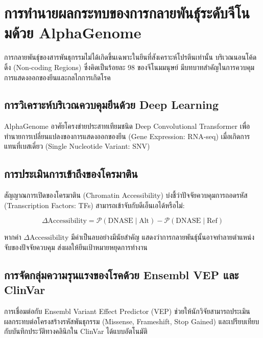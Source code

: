\chapter{การทำนายผลกระทบของการกลายพันธุ์ระดับจีโนมด้วย AlphaGenome}

การกลายพันธุ์ของสารพันธุกรรมไม่ได้เกิดขึ้นเฉพาะในยีนที่สังเคราะห์โปรตีนเท่านั้น บริเวณนอนโค้ดดิ้ง (Non-coding Regions) ซึ่งคิดเป็นร้อยละ 98 ของจีโนมมนุษย์ มีบทบาทสำคัญในการควบคุมการแสดงออกของยีนและกลไกการเกิดโรค

\section{การวิเคราะห์บริเวณควบคุมยีนด้วย Deep Learning}

AlphaGenome อาศัยโครงข่ายประสาทเทียมชนิด Deep Convolutional Transformer เพื่อทำนายการเปลี่ยนแปลงของการแสดงออกของยีน (Gene Expression: RNA-seq) เมื่อเกิดการแทนที่เบสเดี่ยว (Single Nucleotide Variant: SNV)

\section{การประเมินการเข้าถึงของโครมาติน}

สัญญาณการเปิดของโครมาติน (Chromatin Accessibility) บ่งชี้ว่าปัจจัยควบคุมการถอดรหัส (Transcription Factors: TFs) สามารถเข้าจับกับดีเอ็นเอได้หรือไม่:

\begin{equation}
\Delta \text{Accessibility} = \mathcal{P}(\text{DNASE} \mid \text{Alt}) - \mathcal{P}(\text{DNASE} \mid \text{Ref})
\end{equation}

หากค่า $\Delta \text{Accessibility}$ มีค่าเป็นลบอย่างมีนัยสำคัญ แสดงว่าการกลายพันธุ์นั้นอาจทำลายตำแหน่งจับของปัจจัยควบคุม ส่งผลให้ยีนเป้าหมายหยุดการทำงาน

\section{การจัดกลุ่มความรุนแรงของโรคด้วย Ensembl VEP และ ClinVar}

การเชื่อมต่อกับ Ensembl Variant Effect Predictor (VEP) ช่วยให้นักวิจัยสามารถประเมินผลกระทบต่อโครงสร้างรหัสพันธุกรรม (Missense, Frameshift, Stop Gained) และเปรียบเทียบกับบันทึกประวัติทางคลินิกใน ClinVar ได้แบบอัตโนมัติ

